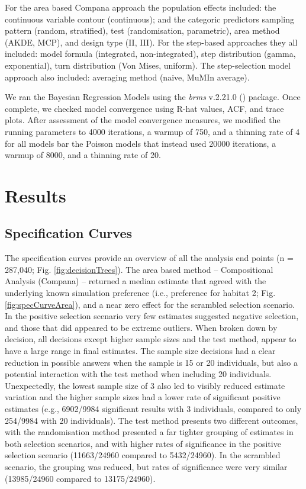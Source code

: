 \documentclass[10pt,a4paper]{article}
\begin{document}
For the area based Compana approach the population effects included: the continuous variable contour (continuous); and the categoric predictors sampling pattern (random, stratified), test (randomisation, parametric), area method (AKDE, MCP), and design type (II, III).
For the step-based approaches they all included: model formula (integrated, non-integrated), step distribution (gamma, exponential), turn distribution (Von Mises, uniform).
The step-selection model approach also included: averaging method (naive, MuMIn average).

We ran the Bayesian Regression Models using the \emph{brms} v.2.21.0 () package.
Once complete, we checked model convergence using R-hat values, ACF, and trace plots.
After assessment of the model convergence measures, we modified the running parameters to 4000 iterations, a warmup of 750, and a thinning rate of 4 for all models bar the Poisson models that instead used 20000 iterations, a warmup of 8000, and a thinning rate of 20.

\section{Results}\label{results}

\subsection{Specification Curves}\label{specification-curves}

The specification curves provide an overview of all the analysis end points (n = 287,040; Fig. \ref{fig:decisionTrees}).
The area based method -- Compositional Analysis (Compana) -- returned a median estimate that agreed with the underlying known simulation preference (i.e., preference for habitat 2; Fig. \ref{fig:specCurveArea}), and a near zero effect for the scrambled selection scenario.
In the positive selection scenario very few estimates suggested negative selection, and those that did appeared to be extreme outliers.
When broken down by decision, all decisions except higher sample sizes and the test method, appear to have a large range in final estimates.
The sample size decisions had a clear reduction in possible answers when the sample is 15 or 20 individuals, but also a potential interaction with the test method when including 20 individuals.
Unexpectedly, the lowest sample size of 3 also led to visibly reduced estimate variation and the higher sample sizes had a lower rate of significant positive estimates (e.g., 6902/9984 significant results with 3 individuals, compared to only 254/9984 with 20 individuals).
The test method presents two different outcomes, with the randomisation method presented a far tighter grouping of estimates in both selection scenarios, and with higher rates of significance in the positive selection scenario (11663/24960 compared to 5432/24960).
In the scrambled scenario, the grouping was reduced, but rates of significance were very similar (13985/24960 compared to 13175/24960).
\end{document}
